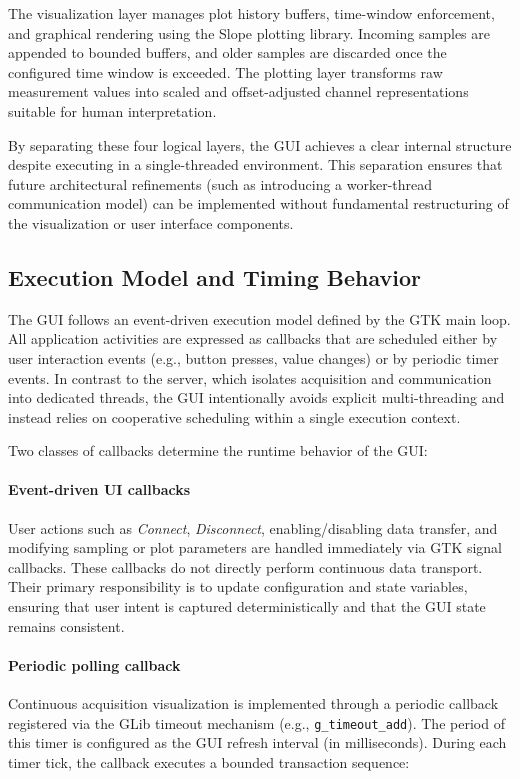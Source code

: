 The visualization layer manages plot history buffers, time-window enforcement, and graphical rendering using the Slope plotting library. Incoming samples are appended to bounded buffers, and older samples are discarded once the configured time window is exceeded. The plotting layer transforms raw measurement values into scaled and offset-adjusted channel representations suitable for human interpretation.

By separating these four logical layers, the GUI achieves a clear internal structure despite executing in a single-threaded environment. This separation ensures that future architectural refinements (such as introducing a worker-thread communication model) can be implemented without fundamental restructuring of the visualization or user interface components.

\subsection{Execution Model and Timing Behavior}
\label{sec:gui_exec_model}

The GUI follows an event-driven execution model defined by the GTK main loop. All application activities are expressed as callbacks that are scheduled either by user interaction events (e.g., button presses, value changes) or by periodic timer events. In contrast to the server, which isolates acquisition and communication into dedicated threads, the GUI intentionally avoids explicit multi-threading and instead relies on cooperative scheduling within a single execution context.

Two classes of callbacks determine the runtime behavior of the GUI:

\paragraph{Event-driven UI callbacks}
User actions such as \emph{Connect}, \emph{Disconnect}, enabling/disabling data transfer, and modifying sampling or plot parameters are handled immediately via GTK signal callbacks. These callbacks do not directly perform continuous data transport. Their primary responsibility is to update configuration and state variables, ensuring that user intent is captured deterministically and that the GUI state remains consistent.

\paragraph{Periodic polling callback}
Continuous acquisition visualization is implemented through a periodic callback registered via the GLib timeout mechanism (e.g., \texttt{g\_timeout\_add}). The period of this timer is configured as the GUI refresh interval (in milliseconds). During each timer tick, the callback executes a bounded transaction sequence:

